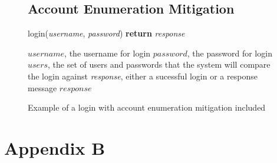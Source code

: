 \documentclass{ueacmpstyle}
\begin{document}
            \begin{figure}[ht]
                \subsection{Account Enumeration Mitigation}
                \label{sec:account-enumeration}
                \centering
                \begin{algorithm}[H]
                \caption{login(\emph{username}, \emph{password}) {\bf return} \emph{response}}
                      \begin{algorithmic}[1]
                          \Require $username$, the username for login
                          \Require $password$, the password for login
                          \Require $users$, the set of users and passwords that the system will 
                                    compare the login against
                          \Ensure \emph{response}, either a sucessful login or a response message
                              \Else
                              \EndIf
                            \Else
                            \EndIf
                          \EndFor
                          \State \Return $response$
                      \end{algorithmic}
                \end{algorithm}
                \caption{Example of a login with account enumeration mitigation included}
                \label{fig:account-enumeration}
            \end{figure}

        \section{Appendix B}\label{app:B}
\end{document}
